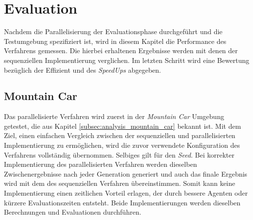 \section{Evaluation}
Nachdem die Parallelisierung der Evaluationsphase durchgeführt und die Testumgebung spezifiziert ist, wird in diesem Kapitel die Performance des Verfahrens gemessen. Die hierbei erhaltenen Ergebnisse werden mit denen der sequenziellen Implementierung verglichen. Im letzten Schritt wird eine Bewertung bezüglich der Effizient und des \emph{SpeedUps} abgegeben.

\subsection{Mountain Car}
Das parallelisierte Verfahren wird zuerst in der \emph{Mountain Car} Umgebung getestet, die aus Kapitel \ref{subsec:analysis_mountain_car} bekannt ist. Mit dem Ziel, einen einfachen Vergleich zwischen der sequenziellen und parallelisierten Implementierung zu ermöglichen, wird die zuvor verwendete Konfiguration des Verfahrens vollständig übernommen. Selbiges gilt für den \emph{Seed}. Bei korrekter Implementierung des parallelisierten Verfahren werden dieselben Zwischenergebnisse nach jeder Generation generiert und auch das finale Ergebnis wird mit dem des sequenziellen Verfahren übereinstimmen. Somit kann keine Implementierung einen zeitlichen Vorteil erlagen, der durch bessere Agenten oder kürzere Evaluationszeiten entsteht. Beide Implementierungen werden dieselben Berechnungen und Evaluationen durchführen.

